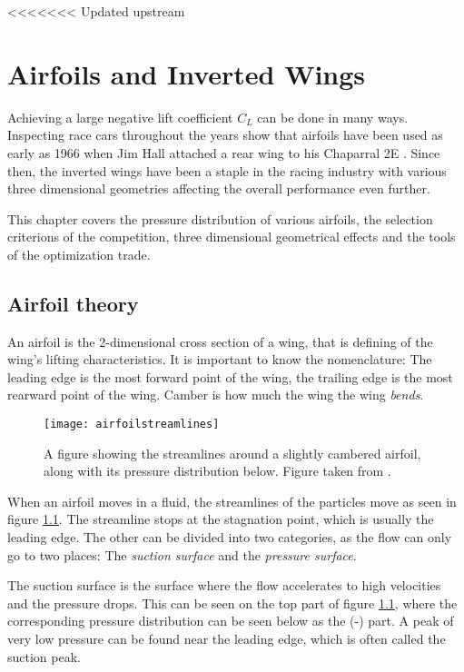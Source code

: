 <<<<<<< Updated upstream
\chapter{Airfoils and Inverted Wings}      

Achieving a large negative lift coefficient $C_L$ can be done in many ways. Inspecting race cars throughout the years show that airfoils have been used as early as 1966 when Jim Hall attached a rear wing to his Chaparral 2E \cite{hucho}. Since then, the inverted wings have been a staple in the racing industry with various three dimensional geometries affecting the overall performance even further.

This chapter covers the pressure distribution of various airfoils, the selection criterions of the competition, three dimensional geometrical effects and the tools of the optimization trade.

\section{Airfoil theory}

  An airfoil is the 2-dimensional cross section of a wing, that is defining of the wing's lifting characteristics. It is important to know the nomenclature: The leading edge is  the most forward point of the wing, the trailing edge is the most rearward point of the wing. Camber is how much the wing the wing \emph{bends}. 

  \begin{figure}
    \texttt{[image: airfoilstreamlines]}
    \caption{A figure showing the streamlines around a slightly cambered airfoil, along with its pressure distribution below. Figure taken from \cite{jkatz}.}
    \label{fig:airfoilstreamlines}
  \end{figure}

  When an airfoil moves in a fluid, the streamlines of the particles move as seen in figure \ref{fig:airfoilstreamlines}. The streamline stops at the stagnation point, which is usually the leading edge. The other can be divided into two categories, as the flow can only go to two places: The \emph{suction surface} and the \emph{pressure surface}.

  The suction surface is the surface where the flow accelerates to high velocities and the pressure drops. This can be seen on the top part of figure \ref{fig:airfoilstreamlines}, where the corresponding pressure distribution can be seen below as the (-) part. A peak of very low pressure can be found near the leading edge, which is often called the suction peak.

